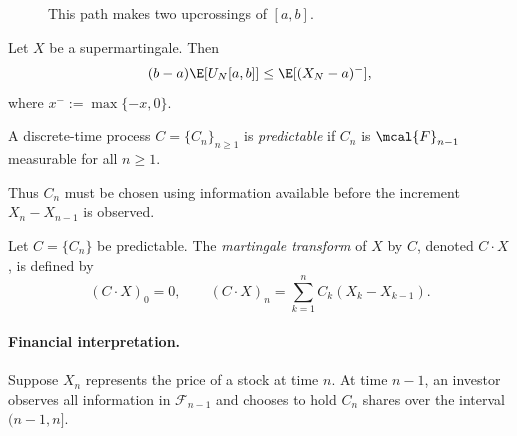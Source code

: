 \begin{figure}[h]
\centering
\caption{This path makes two upcrossings of $[a,b]$.}
\end{figure}

\begin{theorem}
Let $X$ be a supermartingale. Then
\[
    (b-a)\E[U_N[a,b]]
    \leq
    \E[(X_N-a)^-],
\]
where $x^-:=\max\{-x,0\}$.
\end{theorem}

\begin{definition}
A discrete-time process $C=\{C_n\}_{n\geq 1}$ is
\emph{predictable} if $C_n$ is $\mcal{F}_{n-1}$ measurable for all $n \ge 1$.
\end{definition}

Thus $C_n$ must be chosen using information available before the
increment $X_n-X_{n-1}$ is observed.

\begin{definition}
Let $C=\{C_n\}$ be predictable. The \emph{martingale transform} of
$X$ by $C$, denoted $C\cdot X$, is defined by
\[
    (C\cdot X)_0=0,
    \qquad
    (C\cdot X)_n
    =
    \sum_{k=1}^n C_k(X_k-X_{k-1}).
\]
\end{definition}

\paragraph{Financial interpretation.}
Suppose $X_n$ represents the price of a stock at time $n$.
At time $n-1$, an investor observes all information in
$\mathcal F_{n-1}$ and chooses to hold $C_n$ shares over
the interval $(n-1,n]$.

